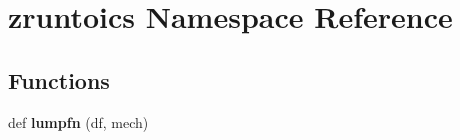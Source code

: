 \hypertarget{namespacezruntoics}{}\section{zruntoics Namespace Reference}
\label{namespacezruntoics}
\subsection*{Functions}
\begin{DoxyCompactItemize}
\item 
\mbox{\label{namespacezruntoics_ab6c452382673032c6d5c924d26b2f8fe}} 
def {\bfseries lumpfn} (df, mech)
\item 
\mbox{\label{namespacezruntoics_a75bb8ccffc15d458862807c6f9b4f4fc}} 

\end{DoxyCompactItemize}
